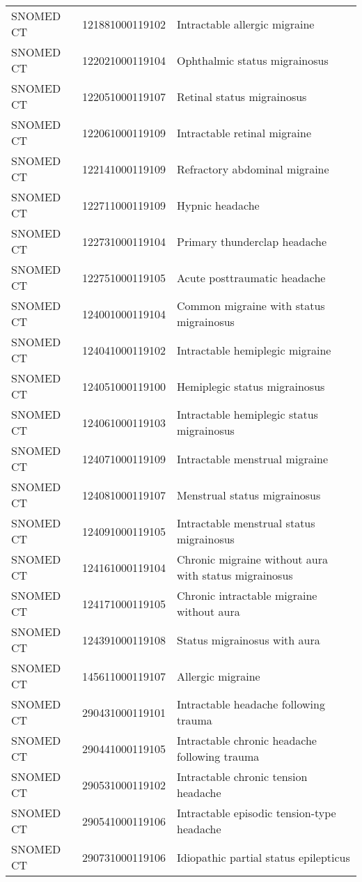 \begin{longtable}{p{}p{}p{}}
  SNOMED CT & 121881000119102 & Intractable allergic migraine \\ 
  SNOMED CT & 122021000119104 & Ophthalmic status migrainosus \\ 
  SNOMED CT & 122051000119107 & Retinal status migrainosus \\ 
  SNOMED CT & 122061000119109 & Intractable retinal migraine \\ 
  SNOMED CT & 122141000119109 & Refractory abdominal migraine \\ 
  SNOMED CT & 122711000119109 & Hypnic headache \\ 
  SNOMED CT & 122731000119104 & Primary thunderclap headache \\ 
  SNOMED CT & 122751000119105 & Acute posttraumatic headache \\ 
  SNOMED CT & 124001000119104 & Common migraine with status migrainosus \\ 
  SNOMED CT & 124041000119102 & Intractable hemiplegic migraine \\ 
  SNOMED CT & 124051000119100 & Hemiplegic status migrainosus \\ 
  SNOMED CT & 124061000119103 & Intractable hemiplegic status migrainosus \\ 
  SNOMED CT & 124071000119109 & Intractable menstrual migraine \\ 
  SNOMED CT & 124081000119107 & Menstrual status migrainosus \\ 
  SNOMED CT & 124091000119105 & Intractable menstrual status migrainosus \\ 
  SNOMED CT & 124161000119104 & Chronic migraine without aura with status migrainosus \\ 
  SNOMED CT & 124171000119105 & Chronic intractable migraine without aura \\ 
  SNOMED CT & 124391000119108 & Status migrainosus with aura \\ 
  SNOMED CT & 145611000119107 & Allergic migraine \\ 
  SNOMED CT & 290431000119101 & Intractable headache following trauma \\ 
  SNOMED CT & 290441000119105 & Intractable chronic headache following trauma \\ 
  SNOMED CT & 290531000119102 & Intractable chronic tension headache \\ 
  SNOMED CT & 290541000119106 & Intractable episodic tension-type headache \\ 
  SNOMED CT & 290731000119106 & Idiopathic partial status epilepticus \\ 

\end{longtable}
